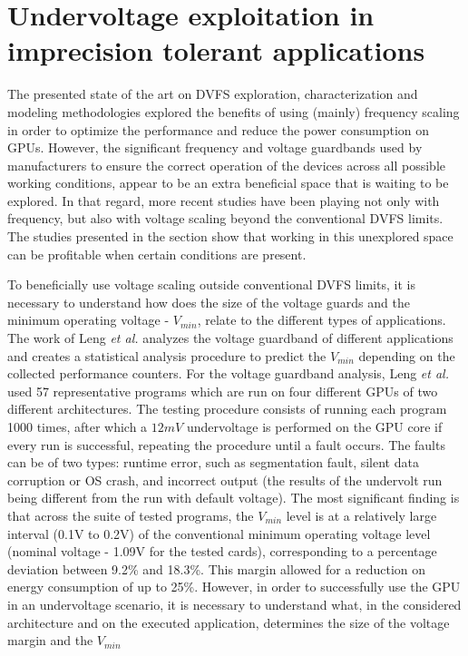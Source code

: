 \section{Undervoltage exploitation in imprecision tolerant applications}

The presented state of the art on DVFS exploration, characterization and modeling methodologies explored the benefits of using (mainly) frequency scaling in order to optimize the performance and reduce the power consumption on GPUs. However, the significant frequency and voltage guardbands used by manufacturers to ensure the correct operation of the devices across all possible working conditions, appear to be an extra beneficial space that is waiting to be explored.  In that regard, more recent studies have been playing not only with frequency, but also with voltage scaling beyond the conventional DVFS limits. The studies presented in the section show that working in this unexplored space can be profitable when certain conditions are present.

To beneficially use voltage scaling outside conventional DVFS limits, it is necessary to understand how does the size of the voltage guards and the minimum operating voltage - $V_{min}$, relate to the different types of applications. The work of Leng \textit{et al.} \cite{leng_safe_2015} analyzes the voltage guardband of different applications and creates a statistical analysis procedure to predict the $V_{min}$ depending on the collected performance counters. For the voltage guardband analysis, Leng \textit{et al.} used 57 representative programs which are run on four different GPUs of two different architectures. The testing procedure consists of running each program 1000 times, after which a $12mV$ undervoltage is performed on the GPU core if every run is successful, repeating the procedure until a fault occurs. The faults can be of two types: runtime error, such as segmentation fault, silent data corruption or OS crash, and incorrect output (the results of the undervolt run being different from the run with default voltage).  The most significant finding is that across the suite of tested programs, the $V_{min}$ level is at a relatively large interval (0.1V to 0.2V) of the conventional minimum operating voltage level (nominal voltage - 1.09V for the tested cards), corresponding to a percentage deviation between 9.2\% and 18.3\%. This margin allowed for a reduction on energy consumption of up to 25\%. However, in order to successfully use the GPU in an undervoltage scenario, it is necessary to understand what, in the considered architecture and on the executed application, determines the size of the voltage margin and the $V_{min}$ 

